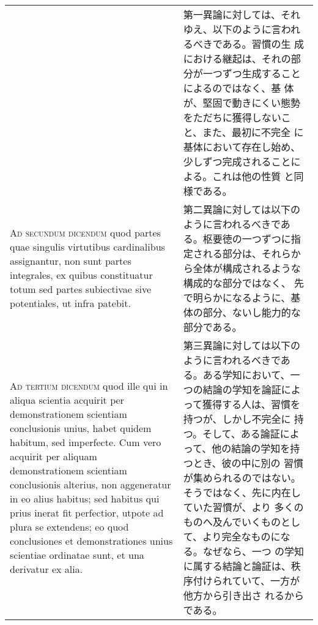 \documentclass[10pt]{jsarticle}
\begin{document}
\begin{longtable}{p{21em}p{21em}}
&

第一異論に対しては、それゆえ、以下のように言われるべきである。習慣の生
成における継起は、それの部分が一つずつ生成することによるのではなく、基
体が、堅固で動きにくい態勢をただちに獲得しないこと、また、最初に不完全
に基体において存在し始め、少しずつ完成されることによる。これは他の性質
と同様である。

\\

{\scshape Ad secundum dicendum} quod partes quae singulis virtutibus
cardinalibus assignantur, non sunt partes integrales, ex quibus
constituatur totum sed partes subiectivae sive potentiales, ut infra
patebit.

&

第二異論に対しては以下のように言われるべきである。枢要徳の一つずつに指
定される部分は、それらから全体が構成されるような構成的な部分ではなく、
先で明らかになるように、基体の部分、ないし能力的な部分である。

\\

{\scshape Ad tertium dicendum} quod ille qui in aliqua scientia
acquirit per demonstrationem scientiam conclusionis unius, habet
quidem habitum, sed imperfecte. Cum vero acquirit per aliquam
demonstrationem scientiam conclusionis alterius, non aggeneratur in eo
alius habitus; sed habitus qui prius inerat fit perfectior, utpote ad
plura se extendens; eo quod conclusiones et demonstrationes unius
scientiae ordinatae sunt, et una derivatur ex alia.

&

第三異論に対しては以下のように言われるべきである。ある学知において、一
つの結論の学知を論証によって獲得する人は、習慣を持つが、しかし不完全に
持つ。そして、ある論証によって、他の結論の学知を持つとき、彼の中に別の
習慣が集められるのではない。そうではなく、先に内在していた習慣が、より
多くのものへ及んでいくものとして、より完全なものになる。なぜなら、一つ
の学知に属する結論と論証は、秩序付けられていて、一方が他方から引き出さ
れるからである。

\end{longtable}
\end{document}

